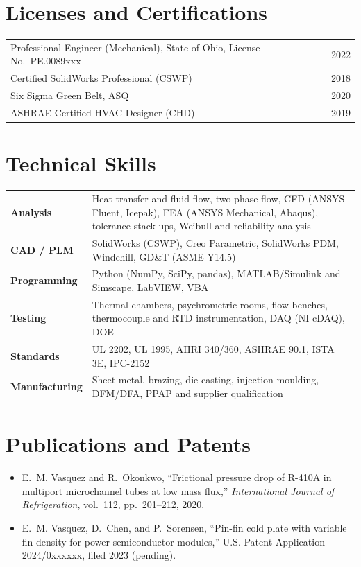 \documentclass[11pt,letterpaper]{article}
\begin{document}
\section{Licenses and Certifications}
\begin{tabularx}{\textwidth}{@{}X r@{}}
  Professional Engineer (Mechanical), State of Ohio, License No.\ PE.0089xxx & 2022 \\
  Certified SolidWorks Professional (CSWP) & 2018 \\
  Six Sigma Green Belt, ASQ & 2020 \\
  ASHRAE Certified HVAC Designer (CHD) & 2019 \\
\end{tabularx}

\section{Technical Skills}
\renewcommand{\arraystretch}{1.25}
\begin{tabularx}{\textwidth}{@{}p{1.55in} X@{}}
  \textbf{Analysis}    & Heat transfer and fluid flow, two-phase flow, CFD (ANSYS Fluent, Icepak), FEA (ANSYS Mechanical, Abaqus), tolerance stack-ups, Weibull and reliability analysis \\
  \textbf{CAD / PLM}   & SolidWorks (CSWP), Creo Parametric, SolidWorks PDM, Windchill, GD\&T (ASME Y14.5) \\
  \textbf{Programming} & Python (NumPy, SciPy, pandas), MATLAB/Simulink and Simscape, LabVIEW, VBA \\
  \textbf{Testing}     & Thermal chambers, psychrometric rooms, flow benches, thermocouple and RTD instrumentation, DAQ (NI cDAQ), DOE \\
  \textbf{Standards}   & UL 2202, UL 1995, AHRI 340/360, ASHRAE 90.1, ISTA 3E, IPC-2152 \\
  \textbf{Manufacturing} & Sheet metal, brazing, die casting, injection moulding, DFM/DFA, PPAP and supplier qualification \\
\end{tabularx}

\section{Publications and Patents}
\begin{itemize}
  \item E.~M. Vasquez and R.~Okonkwo, ``Frictional pressure drop of R-410A in multiport microchannel tubes at low mass flux,'' \textit{International Journal of Refrigeration}, vol.~112, pp.~201--212, 2020.
  \item E.~M. Vasquez, D.~Chen, and P.~Sorensen, ``Pin-fin cold plate with variable fin density for power semiconductor modules,'' U.S. Patent Application 2024/0xxxxxx, filed 2023 (pending).
\end{itemize}
\end{document}
